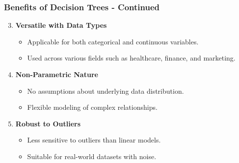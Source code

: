 \documentclass[aspectratio=169]{beamer}
\begin{document}
\begin{frame}[fragile]
  \frametitle{Benefits of Decision Trees - Continued}
  \begin{enumerate}
    \setcounter{enumi}{2} %
    \item \textbf{Versatile with Data Types}
      \begin{itemize}
        \item Applicable for both categorical and continuous variables.
        \item Used across various fields such as healthcare, finance, and marketing.
      \end{itemize}

    \item \textbf{Non-Parametric Nature}
      \begin{itemize}
        \item No assumptions about underlying data distribution.
        \item Flexible modeling of complex relationships.
      \end{itemize}

    \item \textbf{Robust to Outliers}
      \begin{itemize}
        \item Less sensitive to outliers than linear models.
        \item Suitable for real-world datasets with noise.
      \end{itemize}
  \end{enumerate}
\end{frame}
\end{document}
